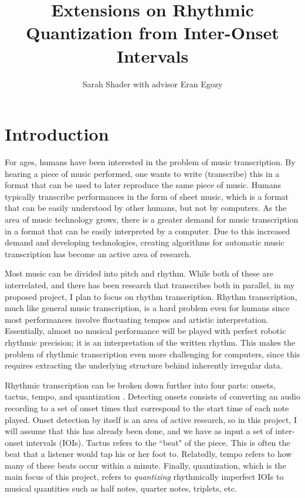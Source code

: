\documentclass[11pt]{article}
\title{Extensions on Rhythmic Quantization from Inter-Onset Intervals}
\author{Sarah Shader with advisor Eran Egozy}
\begin{document}
\maketitle
\section{Introduction}
For ages, humans have been interested in the problem of music transcription. By hearing a piece of music performed, one wants to write (transcribe) this in a format that can be used to later reproduce the same piece of music. Humans typically transcribe performances in the form of sheet music, which is a format that can be easily understood by other humans, but not by computers. As the area of music technology grows, there is a greater demand for music transcription in a format that can be easily interpreted by a computer. Due to this increased demand and developing technologies, creating algorithms for automatic music transcription has become an active area of research.

Most music can be divided into pitch and rhythm. While both of these are interrelated, and there has been research that transcribes both in parallel, in my proposed project, I plan to focus on rhythm transcription. Rhythm transcription, much like general music transcription, is a hard problem even for humans since most performances involve fluctuating tempos and artistic interpretation. Essentially, almost no musical performance will be played with perfect robotic rhythmic precision; it is an interpretation of the written rhythm. This makes the problem of rhythmic transcription even more challenging for computers, since this requires extracting the underlying structure behind inherently irregular data.

Rhythmic transcription can be broken down further into four parts: onsets, tactus, tempo, and quantization \cite{amt}. Detecting onsets consists of converting an audio recording to a set of onset times that correspond to the start time of each note played. Onset detection by itself is an area of active research, so in this project, I will assume that this has already been done, and we have as input a set of inter-onset intervals (IOIs). Tactus refers to the ``beat" of the piece. This is often the beat that a listener would tap his or her foot to. Relatedly, tempo refers to how many of these beats occur within a minute. Finally, quantization, which is the main focus of this project, refers to \textit{quantizing} rhythmically imperfect IOIs to musical quantities such as half notes, quarter notes, triplets, etc. 
\end{document}
